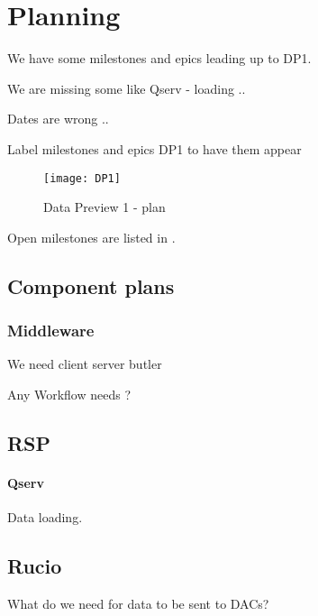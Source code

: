 \section{Planning} \label{sec:plan}

We have some milestones and epics leading up to DP1.

We are missing some like Qserv - loading ..

Dates are wrong ..

Label milestones and epics DP1 to have them appear

\begin{figure}
\begin{centering}
\texttt{[image: DP1]}
	\caption{Data Preview 1 - plan \label{fig:plan}}
\end{centering}
\end{figure}



Open milestones are listed in .



\subsection{Component plans}
\subsubsection{Middleware}
We need client server butler 

Any Workflow needs ?

\subsection{RSP}

\paragraph{Qserv}
Data loading.


\subsection{Rucio}
What do we need for data to be sent to DACs?

